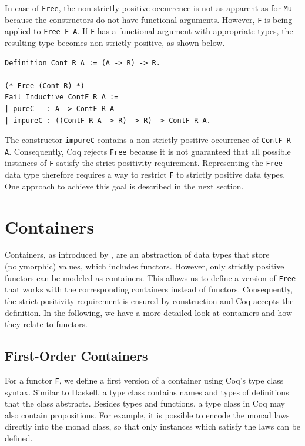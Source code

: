 \documentclass[a4paper, 11pt, fleqn, twoside, abstract=on]{scrreprt}
\newcommand{\cinl}[1]{\texttt{#1}}
\begin{document}
In case of \cinl{Free}, the non-strictly positive occurrence is not as apparent as for \cinl{Mu} because the constructors do not have functional arguments.
However, \cinl{F} is being applied to \texttt{Free F A}.
If \texttt{F} has a functional argument with appropriate types, the resulting type becomes non-strictly positive, as shown below.

\begin{verbatim}
Definition Cont R A := (A -> R) -> R.

(* Free (Cont R) *)
Fail Inductive ContF R A :=
| pureC   : A -> ContF R A
| impureC : ((ContF R A -> R) -> R) -> ContF R A.
\end{verbatim}

The constructor \texttt{impureC} contains a non-strictly positive occurrence of \texttt{ContF R A}.
Consequently, Coq rejects \texttt{Free} because it is not guaranteed that all possible instances of \cinl{F} satisfy the strict positivity requirement.
Representing the \texttt{Free} data type therefore requires a way to restrict \cinl{F} to strictly positive data types.
One approach to achieve this goal is described in the next section.

\section{Containers}

Containers, as introduced by \citet{abbott2003categories}, are an abstraction of data types that store (polymorphic) values, which includes functors.
However, only strictly positive functors can be modeled as containers.
This allows us to define a version of \cinl{Free} that works with the corresponding containers instead of functors.
Consequently, the strict positivity requirement is ensured by construction and Coq accepts the definition.
In the following, we have a more detailed look at containers and how they relate to functors.

\subsection{First-Order Containers}
For a functor \cinl{F}, we define a first version of a container using Coq's type class syntax.
Similar to Haskell, a type class contains names and types of definitions that the class abstracts.
Besides types and functions, a type class in Coq may also contain propositions.
For example, it is possible to encode the monad laws directly into the monad class, so that only instances which satisfy the laws can be defined.
\end{document}
